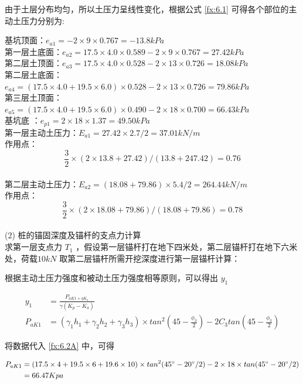 由于土层分布均匀，所以土压力呈线性变化，根据公式 \ref{fx:6.1} 可得各个部位的主动土压力分别为:

基坑顶面：$e_{a1}=-2×9×0.767=-13.8 kPa$\\

第一层土底面：$e_{a2}=17.5×4.0×0.589-2×9×0.767=27.42 kPa $\\

第二层土顶面：$e_{a3}=17.5×4.0×0.528-2×13×0.726=18.08 kPa$\\

第二层土底面：$e_{a4}=(17.5×4.0+19.5×6.0)×0.528-2×13×0.726=79.86 kPa$\\

第三层土顶面：$e_{a5}=(17.5×4.0+19.5×6.0)×0.490-2×18×0.700=66.43 kPa$\\

基坑底 ：$e_{p1}=2×18×1.37=49.50kPa $\\

第一层主动土压力：$E_{a1}=27.42×2.7/2=37.01kN/m $\\

作用点：\[\frac{3}{2}\times(2\times 13.8+27.42)/(13.8+247.42)=0.76\]\\

第二层主动土压力：$E_{a2}=(18.08+79.86)×5.4/2=264.44kN/m$\\

作用点：\[\frac{3}{2}\times(2\times 18.08+79.86)/(18.08+79.86)=0.78\]\\

(2) 桩的锚固深度及锚杆的支点力计算\\

求第一层支点力 $T_1$ ，假设第一层锚杆打在地下四米处，第二层锚杆打在地下六米处，荷载$ 10 kN$
取第二层锚杆所需开挖深度进行第一层锚杆计算：

根据主动土压力强度和被动土压力强度相等原则，可以得出 $y_1$

\begin{align}
    \label{fx:6.2}
    y_1&=\frac{P_{aK1+qK_a}}{\gamma (K_p-K_a)}\\
    \label{fx:6.2A}
    P_{aK1}&=(\gamma_1h_1+\gamma_2h_2+\gamma_3h_3)\times tan^2(45-\frac{\phi_3}{2})-2C_3tan(45-\frac{\phi_3}{2})
\end{align}

将数据代入 \ref{fx:6.2A} 中，可得

\begin{align*}
P_{aK1}&=(17.5\times 4+19.5\times 6+19.6\times 10)\times tan^2(45^{\circ} -20^{\circ} /2)-2\times 18\times tan(45^{\circ} -20^{\circ} /2)\\
&=66.47 Kpa
\end{align*}

